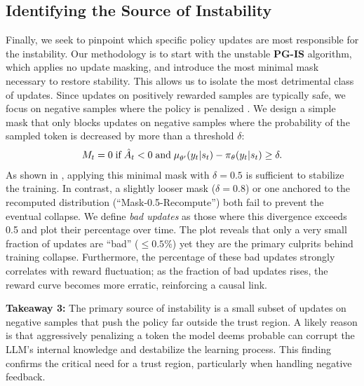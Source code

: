 \subsection{Identifying the Source of Instability}  

Finally, we seek to pinpoint which specific policy updates are most responsible for the instability. Our methodology is to start with the unstable \textbf{PG-IS} algorithm, which applies no update masking, and introduce the most minimal mask necessary to restore stability. This allows us to isolate the most detrimental class of updates.  
Since updates on positively rewarded samples are typically safe, we focus on negative samples where the policy is penalized \citep{liu2025deepseek, ren2025learning_dynamics_LLM}. We design a simple mask that only blocks updates on negative samples where the probability of the sampled token is decreased by more than a threshold $\delta$: 
\begin{align*}  
M_t = 0 \; \text{if} \; \hat{A}_t < 0 \; \text{and} \; {\operatorname*{{\textcolor{black}{\mu}}}}_{\theta'}(y_t|s_t) - {\operatorname*{{\textcolor{black}{\pi}}}}_{\theta}(y_t|s_t) \ge \delta.  
\end{align*}  
As shown in , applying this minimal mask with $\delta=0.5$ is sufficient to stabilize the training. In contrast, a slightly looser mask ($\delta=0.8$) or one anchored to the recomputed distribution (``Mask-0.5-Recompute'') both fail to prevent the eventual collapse. We define \textit{bad updates} as those where this divergence exceeds 0.5 and plot their percentage over time. The plot reveals that only a very small fraction of updates are ``bad'' ($\leq 0.5\%$) yet they are the primary culprits behind training collapse. Furthermore, the percentage of these bad updates strongly correlates with reward fluctuation; as the fraction of bad updates rises, the reward curve becomes more erratic, reinforcing a causal link.

\textbf{Takeaway 3:} The primary source of instability is a small subset of updates on negative samples that push the policy far outside the trust region. A likely reason is that aggressively penalizing a token the model deems probable can corrupt the LLM's internal knowledge and destabilize the learning process. This finding confirms the critical need for a trust region, particularly when handling negative feedback.  


